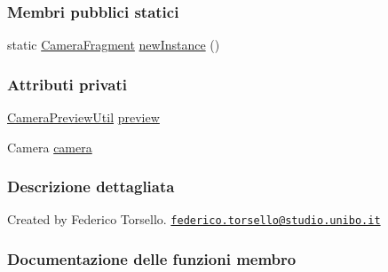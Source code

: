 \subsubsection*{Membri pubblici statici}
\begin{DoxyCompactItemize}
\item 
static \hyperlink{classit_1_1unibo_1_1torsello_1_1bluetoothpositioning_1_1fragment_1_1CameraFragment}{Camera\+Fragment} \hyperlink{classit_1_1unibo_1_1torsello_1_1bluetoothpositioning_1_1fragment_1_1CameraFragment_a06506c839e3206fbe082ab705cb627b5_a06506c839e3206fbe082ab705cb627b5}{new\+Instance} ()
\end{DoxyCompactItemize}
\subsubsection*{Attributi privati}
\begin{DoxyCompactItemize}
\item 
\hyperlink{classit_1_1unibo_1_1torsello_1_1bluetoothpositioning_1_1util_1_1CameraPreviewUtil}{Camera\+Preview\+Util} \hyperlink{classit_1_1unibo_1_1torsello_1_1bluetoothpositioning_1_1fragment_1_1CameraFragment_af14f8f1e4107c9a9063cf70d1fbb5bb5_af14f8f1e4107c9a9063cf70d1fbb5bb5}{preview}
\item 
Camera \hyperlink{classit_1_1unibo_1_1torsello_1_1bluetoothpositioning_1_1fragment_1_1CameraFragment_a70e1c67d2b127530751de08cb289b4c3_a70e1c67d2b127530751de08cb289b4c3}{camera}
\end{DoxyCompactItemize}


\subsubsection{Descrizione dettagliata}
Created by Federico Torsello. \href{mailto:federico.torsello@studio.unibo.it}{\tt federico.\+torsello@studio.\+unibo.\+it} 

\subsubsection{Documentazione delle funzioni membro}
\hypertarget{classit_1_1unibo_1_1torsello_1_1bluetoothpositioning_1_1fragment_1_1CameraFragment_a06506c839e3206fbe082ab705cb627b5_a06506c839e3206fbe082ab705cb627b5}{}\label{classit_1_1unibo_1_1torsello_1_1bluetoothpositioning_1_1fragment_1_1CameraFragment_a06506c839e3206fbe082ab705cb627b5_a06506c839e3206fbe082ab705cb627b5} 
